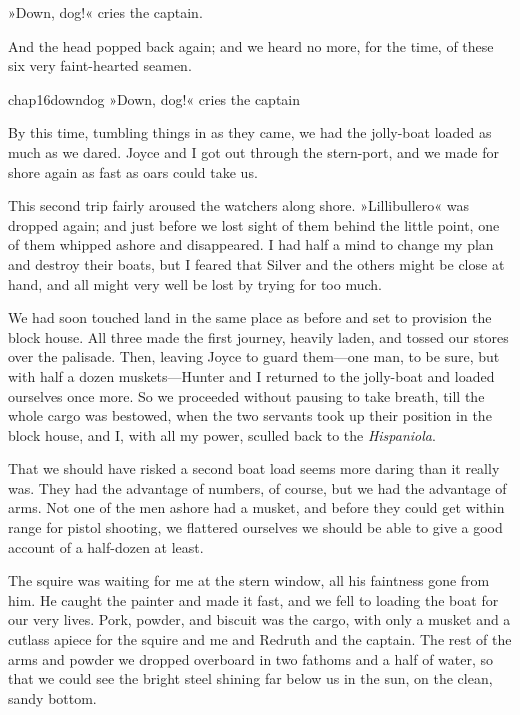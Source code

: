 »Down, dog!« cries the captain.

And the head popped back again; and we heard no more, for the time, of these six very faint-hearted seamen.


\begin{bwbigpic}
	[\picsize]
	{chap16downdog}
	{»Down, dog!« cries the captain}
\end{bwbigpic}

By this time, tumbling things in as they came, we had the jolly-boat loaded as much as we dared. Joyce and I got out through the stern-port, and we made for shore again as fast as oars could take us.

This second trip fairly aroused the watchers along shore. »Lillibullero« was dropped again; and just before we lost sight of them behind the little point, one of them whipped ashore and disappeared. I had half a mind to change my plan and destroy their boats, but I feared that Silver and the others might be close at hand, and all might very well be lost by trying for too much.

We had soon touched land in the same place as before and set to provision the block house. All three made the first journey, heavily laden, and tossed our stores over the palisade. Then, leaving Joyce to guard them—one man, to be sure, but with half a dozen muskets—Hunter and I returned to the jolly-boat and loaded ourselves once more. So we proceeded without pausing to take breath, till the whole cargo was bestowed, when the two servants took up their position in the block house, and I, with all my power, sculled back to the \textit{Hispaniola}.

That we should have risked a second boat load seems more daring than it really was. They had the advantage of numbers, of course, but we had the advantage of arms. Not one of the men ashore had a musket, and before they could get within range for pistol shooting, we flattered ourselves we should be able to give a good account of a half-dozen at least.

The squire was waiting for me at the stern window, all his faintness gone from him. He caught the painter and made it fast, and we fell to loading the boat for our very lives. Pork, powder, and biscuit was the cargo, with only a musket and a cutlass apiece for the squire and me and Redruth and the captain. The rest of the arms and powder we dropped overboard in two fathoms and a half of water, so that we could see the bright steel shining far below us in the sun, on the clean, sandy bottom.

